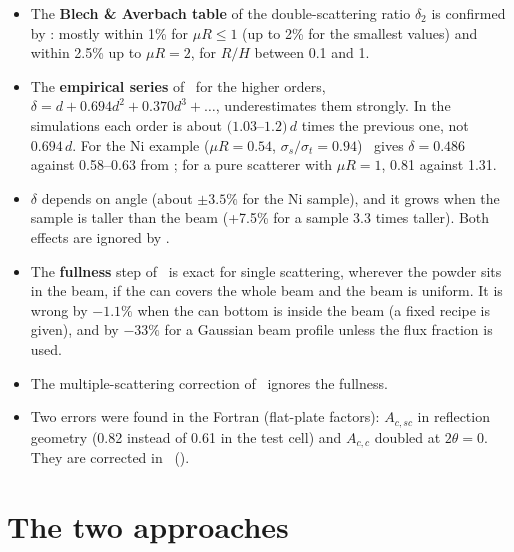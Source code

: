 \documentclass[11pt,a4paper]{report}
\begin{document}
\begin{note}
\begin{itemize}
  \item The \textbf{Blech \& Averbach table} of the double-scattering ratio
        $\delta_2$ is confirmed by \mcams: mostly within 1\% for $\mu R \leq 1$
        (up to 2\% for the smallest values) and within 2.5\% up to $\mu R = 2$,
        for $R/H$ between 0.1 and 1.
  \item The \textbf{empirical series} of \cor\ for the higher orders,
        $\delta = d + 0.694 d^2 + 0.370 d^3 + \dots$, underestimates them
        strongly. In the simulations each order is about $(1.03$--$1.2)\,d$
        times the previous one, not $0.694\,d$. For the Ni example ($\mu R =
        0.54$, $\sigma_s/\sigma_t = 0.94$) \pyc\ gives $\delta = 0.486$ against
        0.58--0.63 from \mcams; for a pure scatterer with $\mu R = 1$, 0.81
        against 1.31.
  \item $\delta$ depends on angle (about $\pm 3.5\%$ for the Ni sample), and it
        grows when the sample is taller than the beam (+7.5\% for a sample
        3.3 times taller). Both effects are ignored by \cor.
\end{itemize}
\end{note}

\begin{note}
\begin{itemize}
  \item The \textbf{fullness} step of \cor\ is exact for single scattering,
        wherever the powder sits in the beam, if the can covers the whole beam
        and the beam is uniform. It is wrong by $-1.1\%$ when the can bottom is
        inside the beam (a fixed recipe is given), and by $-33\%$ for a Gaussian
        beam profile unless the flux fraction is used.
  \item The multiple-scattering correction of \cor\ ignores the fullness.
  \item Two errors were found in the Fortran  (flat-plate factors):
        $A_{c,sc}$ in reflection geometry (0.82 instead of 0.61 in the test
        cell) and $A_{c,c}$ doubled at $2\theta = 0$. They are corrected in
        \pyc\ ().
\end{itemize}
\end{note}

\chapter{The two approaches}
\label{chap:methods}
\end{document}
